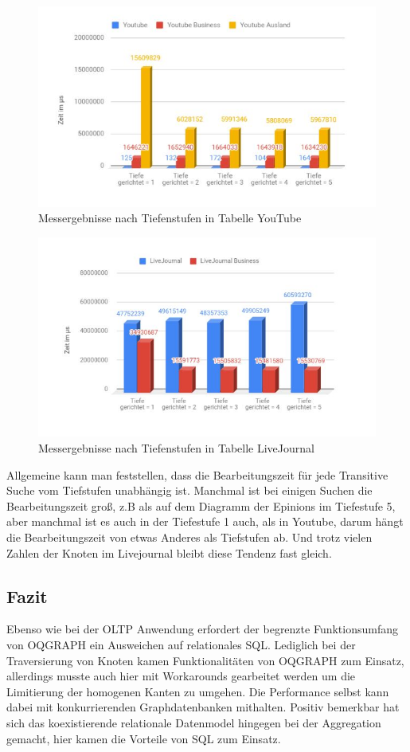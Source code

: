 \begin{figure}
	\centering
	\includegraphics[width=\textwidth]{images/youtub.jpg}
	\caption{Messergebnisse nach Tiefenstufen in Tabelle YouTube}
	\label{fig:youtub}
\end{figure}

\begin{figure}
	\centering
	\includegraphics[width=\textwidth]{images/LiJou.jpg}
	\caption{Messergebnisse nach Tiefenstufen in Tabelle LiveJournal}
	\label{fig:LiJou}
\end{figure}

Allgemeine kann man feststellen, dass die Bearbeitungszeit für jede Transitive Suche vom Tiefstufen unabhängig ist. Manchmal ist bei einigen Suchen die Bearbeitungszeit groß,  z.B als auf dem Diagramm der Epinions im Tiefestufe 5, aber manchmal ist es auch in der Tiefestufe 1 auch, als in Youtube, darum hängt die Bearbeitungszeit von etwas Anderes als Tiefstufen ab. Und trotz vielen Zahlen der Knoten im Livejournal bleibt diese Tendenz fast gleich.

\subsection{Fazit}
Ebenso wie bei der OLTP Anwendung erfordert der begrenzte Funktionsumfang von OQGRAPH ein Ausweichen auf relationales SQL. Lediglich bei der Traversierung von Knoten kamen Funktionalitäten von OQGRAPH zum Einsatz, allerdings musste auch hier mit Workarounds gearbeitet werden um die Limitierung der homogenen Kanten zu umgehen. Die Performance selbst kann dabei mit konkurrierenden Graphdatenbanken mithalten. Positiv bemerkbar hat sich das koexistierende relationale Datenmodel hingegen bei der Aggregation gemacht, hier kamen die Vorteile von SQL zum Einsatz.